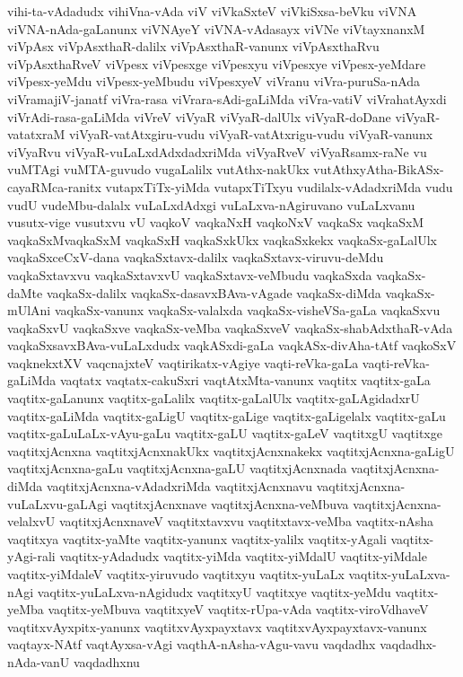 {vihi-ta-vAdadudx
vihiVna-vAda
viV
viVkaSxteV
viVkiSxsa-beVku
viVNA
viVNA-nAda-gaLanunx
viVNAyeY
viVNA-vAdasayx
viVNe
viVtayxnanxM
viVpAsx
viVpAsxthaR-dalilx
viVpAsxthaR-vanunx
viVpAsxthaRvu
viVpAsxthaRveV
viVpesx
viVpesxge
viVpesxyu
viVpesxye
viVpesx-yeMdare
viVpesx-yeMdu
viVpesx-yeMbudu
viVpesxyeV
viVranu
viVra-puruSa-nAda
viVramajiV-janatf
viVra-rasa
viVrara-sAdi-gaLiMda
viVra-vatiV
viVrahatAyxdi
viVrAdi-rasa-gaLiMda
viVreV
viVyaR
viVyaR-dalUlx
viVyaR-doDane
viVyaR-vatatxraM
viVyaR-vatAtxgiru-vudu
viVyaR-vatAtxrigu-vudu
viVyaR-vanunx
viVyaRvu
viVyaR-vuLaLxdAdxdadxriMda
viVyaRveV
viVyaRsamx-raNe
vu
vuMTAgi
vuMTA-guvudo
vugaLalilx
vutAthx-nakUkx
vutAthxyAtha-BikASx-cayaRMca-ranitx
vutapxTiTx-yiMda
vutapxTiTxyu
vudilalx-vAdadxriMda
vudu
vudU
vudeMbu-dalalx
vuLaLxdAdxgi
vuLaLxva-nAgiruvano
vuLaLxvanu
vusutx-vige
vusutxvu
vU
vaqkoV
vaqkaNxH
vaqkoNxV
vaqkaSx
vaqkaSxM
vaqkaSxMvaqkaSxM
vaqkaSxH
vaqkaSxkUkx
vaqkaSxkekx
vaqkaSx-gaLalUlx
vaqkaSxceCxV-dana
vaqkaSxtavx-dalilx
vaqkaSxtavx-viruvu-deMdu
vaqkaSxtavxvu
vaqkaSxtavxvU
vaqkaSxtavx-veMbudu
vaqkaSxda
vaqkaSx-daMte
vaqkaSx-dalilx
vaqkaSx-dasavxBAva-vAgade
vaqkaSx-diMda
vaqkaSx-mUlAni
vaqkaSx-vanunx
vaqkaSx-valalxda
vaqkaSx-visheVSa-gaLa
vaqkaSxvu
vaqkaSxvU
vaqkaSxve
vaqkaSx-veMba
vaqkaSxveV
vaqkaSx-shabAdxthaR-vAda
vaqkaSxsavxBAva-vuLaLxdudx
vaqkASxdi-gaLa
vaqkASx-divAha-tAtf
vaqkoSxV
vaqknekxtXV
vaqcnajxteV
vaqtirikatx-vAgiye
vaqti-reVka-gaLa
vaqti-reVka-gaLiMda
vaqtatx
vaqtatx-cakuSxri
vaqtAtxMta-vanunx
vaqtitx
vaqtitx-gaLa
vaqtitx-gaLanunx
vaqtitx-gaLalilx
vaqtitx-gaLalUlx
vaqtitx-gaLAgidadxrU
vaqtitx-gaLiMda
vaqtitx-gaLigU
vaqtitx-gaLige
vaqtitx-gaLigelalx
vaqtitx-gaLu
vaqtitx-gaLuLaLx-vAyu-gaLu
vaqtitx-gaLU
vaqtitx-gaLeV
vaqtitxgU
vaqtitxge
vaqtitxjAcnxna
vaqtitxjAcnxnakUkx
vaqtitxjAcnxnakekx
vaqtitxjAcnxna-gaLigU
vaqtitxjAcnxna-gaLu
vaqtitxjAcnxna-gaLU
vaqtitxjAcnxnada
vaqtitxjAcnxna-diMda
vaqtitxjAcnxna-vAdadxriMda
vaqtitxjAcnxnavu
vaqtitxjAcnxna-vuLaLxvu-gaLAgi
vaqtitxjAcnxnave
vaqtitxjAcnxna-veMbuva
vaqtitxjAcnxna-velalxvU
vaqtitxjAcnxnaveV
vaqtitxtavxvu
vaqtitxtavx-veMba
vaqtitx-nAsha
vaqtitxya
vaqtitx-yaMte
vaqtitx-yanunx
vaqtitx-yalilx
vaqtitx-yAgali
vaqtitx-yAgi-rali
vaqtitx-yAdadudx
vaqtitx-yiMda
vaqtitx-yiMdalU
vaqtitx-yiMdale
vaqtitx-yiMdaleV
vaqtitx-yiruvudo
vaqtitxyu
vaqtitx-yuLaLx
vaqtitx-yuLaLxva-nAgi
vaqtitx-yuLaLxva-nAgidudx
vaqtitxyU
vaqtitxye
vaqtitx-yeMdu
vaqtitx-yeMba
vaqtitx-yeMbuva
vaqtitxyeV
vaqtitx-rUpa-vAda
vaqtitx-viroVdhaveV
vaqtitxvAyxpitx-yanunx
vaqtitxvAyxpayxtavx
vaqtitxvAyxpayxtavx-vanunx
vaqtayx-NAtf
vaqtAyxsa-vAgi
vaqthA-nAsha-vAgu-vavu
vaqdadhx
vaqdadhx-nAda-vanU
vaqdadhxnu
}
